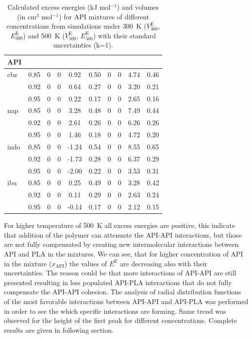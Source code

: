 \begin{table}[htb]
	\caption{Calculated excess energies (kJ mol$^{-1}$) and volumes (in cm$^3$ mol$^{-1}$) for API mixtures of different concentrations from simulations under 300~K ($V_{300}^\text{E}$, $E_{300}^\text{E}$) and 500~K ($V_{500}^\text{E}$, $E_{500}^\text{E}$) with their standard uncertainties (k=1).}
	\centering
	\begin{tabular}{lSSSSSSSSS}
	\toprule
	\textbf{API} &  &  &  &  &  &  &  &  &  \\
	\midrule
		cbz & 0.85 & 0 & 0 & 0.92 & 0.50 & 0 & 0 & 4.74 & 0.46 \\
		& 0.92 & 0 & 0 & 0.64 & 0.27 & 0 & 0 & 3.20 & 0.21 \\
		& 0.95 & 0 & 0 & 0.22 & 0.17 & 0 & 0 & 2.65 & 0.16 \\
		\midrule
		nap & 0.85 & 0 & 0 & 3.28 & 0.48 & 0 & 0 & 7.49 & 0.44 \\
		& 0.92 & 0 & 0 & 2.61 & 0.26 & 0 & 0 & 6.26 & 0.26 \\
		& 0.95 & 0 & 0 & 1.46 & 0.18 & 0 & 0 & 4.72 & 0.20 \\
		\midrule
		indo & 0.85 & 0 & 0 & -1.24 & 0.54 & 0 & 0 & 8.55 & 0.65 \\
		& 0.92 & 0 & 0 & -1.73 & 0.28 & 0 & 0 & 6.37 & 0.29 \\
		& 0.95 & 0 & 0 & -2.00 & 0.22 & 0 & 0 & 3.53 & 0.31 \\
		\midrule
		ibu & 0.85 & 0 & 0 & 0.25 & 0.49 & 0 & 0 & 3.28 & 0.42 \\
		& 0.92 & 0 & 0 & 0.11 & 0.29 & 0 & 0 & 2.63 & 0.24 \\
		& 0.95 & 0 & 0 & -0.14 & 0.17 & 0 & 0 & 2.12 & 0.15 \\
	\bottomrule
	\end{tabular}
	\label{tab:vobjemy} 
\end{table}

For higher temperature of 500~K all excess energies are positive, this indicate that addition of the polymer can attenuate the API-API interactions, but those are not fully compensated by creating new intermolecular interactions between API and PLA in the mixtures. We can see, that for higher concentration of API in the mixture ($x_{\text{API}}$) the values of $E^\text{E}$ are decreasing also with their uncertainties. The reason could be that more interactions of API-API are still presented resulting in less populated API-PLA interactions that do not fully compensate the API-API cohesion. The analysis of radial distribution functions of the most favorable interactions between API-API and API-PLA was performed in order to see the which specific interactions are forming. Same trend was observed for the height of the first peak for different concentrations. Complete results are given in following section.

